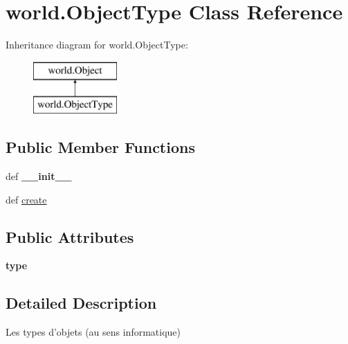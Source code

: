 \hypertarget{classworld_1_1_object_type}{\section{world.\-Object\-Type \-Class \-Reference}
\label{classworld_1_1_object_type}
}
\-Inheritance diagram for world.\-Object\-Type\-:\begin{figure}[H]
\begin{center}
\leavevmode
\includegraphics[height=2.000000cm]{classworld_1_1_object_type}
\end{center}
\end{figure}
\subsection*{\-Public \-Member \-Functions}
\begin{DoxyCompactItemize}
\item 
\hypertarget{classworld_1_1_object_type_a8e22b69e8867f70d768f1c29b5d67299}{def {\bfseries \-\_\-\-\_\-init\-\_\-\-\_\-}}\label{classworld_1_1_object_type_a8e22b69e8867f70d768f1c29b5d67299}

\item 
def \hyperlink{classworld_1_1_object_type_aec3659e529c2f58cc8ec05a759811015}{create}
\end{DoxyCompactItemize}
\subsection*{\-Public \-Attributes}
\begin{DoxyCompactItemize}
\item 
\hypertarget{classworld_1_1_object_type_ae9880fda72c8950d1b1b070efa72279e}{{\bfseries type}}\label{classworld_1_1_object_type_ae9880fda72c8950d1b1b070efa72279e}

\end{DoxyCompactItemize}


\subsection{\-Detailed \-Description}
\begin{DoxyVerb}Les types d'objets (au sens informatique) \end{DoxyVerb}
 


